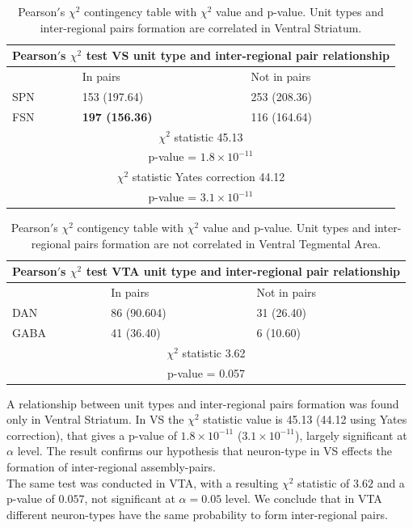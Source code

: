 \begin{table}[H]
\begin{tabular}{ |p{3cm}|p{3cm}|p{3cm}| }
 \hline
 \multicolumn{3}{|c|}{Pearson$'$s $\chi^2$ test VS unit type and inter-regional pair relationship} \\
 \hline
 & In pairs & Not in pairs\\
 \hline
 SPN & 153 (197.64) & 253 (208.36) \\
 \hline
 FSN & \textbf{197 (156.36)} & 116 (164.64)\\
 \hline
 \multicolumn{3}{|c|}{$\chi^2$ statistic  45.13}\\
 \multicolumn{3}{|c|}{p-value = $1.8\times10^{-11}$}\\
 \hline
 \multicolumn{3}{|c|}{$\chi^2$ statistic Yates correction 44.12}\\
 \multicolumn{3}{|c|}{p-value = $3.1\times10^{-11}$}\\
 \hline
\end{tabular}
\caption{Pearson$'$s $\chi^2$ contingency table with $\chi^2$ value and p-value. Unit types and inter-regional pairs formation are correlated in Ventral Striatum.}
\label{tab:chi2_asnotasVS}
\end{table}
\begin{table}[H]
\begin{tabular}{ |p{3cm}|p{3cm}|p{3cm}| }
 \hline
 \multicolumn{3}{|c|}{Pearson$'$s $\chi^2$ test VTA unit type and inter-regional pair relationship} \\
 \hline
 & In pairs & Not in pairs\\
 \hline
 DAN & 86 (90.604) & 31 (26.40) \\
 \hline
 GABA & 41 (36.40) & 6 (10.60)\\
 \hline
 \multicolumn{3}{|c|}{$\chi^2$ statistic  3.62}\\
 \multicolumn{3}{|c|}{p-value = 0.057}\\
 \hline
\end{tabular}
\caption{Pearson$'$s $\chi^2$ contigency table with $\chi^2$ value and p-value. Unit types and inter-regional pairs formation are not correlated in Ventral Tegmental Area.}
\label{tab:chi2_asnotasVTA}
\end{table}
A relationship between unit types and inter-regional pairs formation was found only in Ventral Striatum. In VS the $\chi^2$ statistic value is 45.13 (44.12 using Yates correction), that gives a p-value of $1.8\times10^{-11}$ ($3.1\times10^{-11}$), largely significant at $\alpha$ level. The result confirms our hypothesis that neuron-type in VS effects the formation of inter-regional assembly-pairs.\\The same test was conducted in VTA, with a resulting $\chi^2$ statistic of $3.62$ and a p-value of $0.057$, not significant at $\alpha = 0.05$ level. We conclude that in VTA different neuron-types have the same probability to form inter-regional pairs.\\
